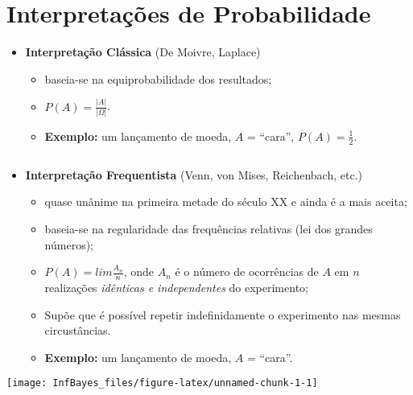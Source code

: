 \documentclass[
]{book}
\providecommand{\tightlist}{%
  \setlength{\itemsep}{0pt}\setlength{\parskip}{0pt}}
\begin{document}
\hypertarget{interpretauxe7uxf5es-de-probabilidade}{%
\section{Interpretações de Probabilidade}\label{interpretauxe7uxf5es-de-probabilidade}}

\begin{itemize}
\tightlist
\item
  \textbf{Interpretação Clássica} (De Moivre, Laplace)

  \begin{itemize}
  \tightlist
  \item
    baseia-se na equiprobabilidade dos resultados;
  \item
    \(P(A) = \frac{|A|}{|\Omega|}\).
  \item
    \textbf{Exemplo:} um lançamento de moeda, \(A\) = ``cara'', \(P(A) = \frac{1}{2}\).
  \end{itemize}
\end{itemize}

\(~\)

\begin{itemize}
\tightlist
\item
  \textbf{Interpretação Frequentista} (Venn, von Mises, Reichenbach, etc.)

  \begin{itemize}
  \tightlist
  \item
    quase unânime na primeira metade do século XX e ainda é a mais aceita;
  \item
    baseia-se na regularidade das frequências relativas (lei dos grandes números);
  \item
    \(P(A) = lim \frac{A_n}{n}\), onde \(A_n\) é o número de ocorrências de \(A\) em \(n\) realizações \emph{idênticas e independentes} do experimento;
  \item
    Supõe que é possível repetir indefinidamente o experimento nas mesmas circustâncias.
  \item
    \textbf{Exemplo:} um lançamento de moeda, \(A\) = ``cara''.
  \end{itemize}
\end{itemize}

\begin{center}\texttt{[image: InfBayes\_files/figure-latex/unnamed-chunk-1-1]} \end{center}

\(~\)
\end{document}
